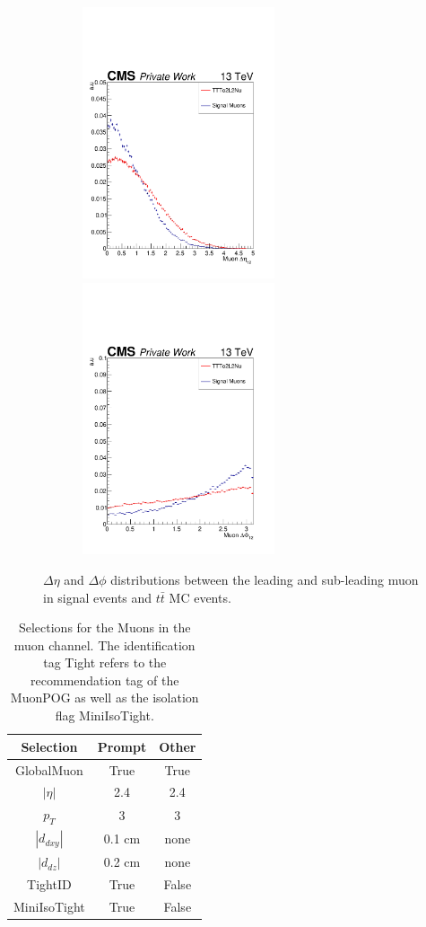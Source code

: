 \documentclass{cernatlasnote}
\begin{document}
\begin{figure}[ht]
\centering
\includegraphics[height=8cm, width=8cm, trim= 0cm 0cm 0cm 0.cm,clip]{images/Muon/MuonMuondEta.pdf}\includegraphics[height=8cm, width=8cm, trim= 0cm 0cm 0cm 0.cm,clip]{images/Muon/MuonMuondPhi.pdf}
\caption{\label{fig:MuondR} $\Delta\eta$ and $\Delta\phi$ distributions between the leading and sub-leading muon in signal events and $t\bar{t}$ MC events.}
\end{figure}
\FloatBarrier

\begin{table}[h]
\centering
\begin{tabular}{|c|c|c|}
  \hline
  \rowcolor{lightgray} 
  Selection & Prompt & Other \\
  \hline
  GlobalMuon & True & True\\
  $|\eta|$ & 2.4 & 2.4\\
  $p_T$ & 3 & 3\\
  $|d_{dxy}|$ & 0.1 cm & none\\
  $|d_{dz}|$ & 0.2 cm & none\\
  TightID & True & False\\
  MiniIsoTight & True & False\\
  \hline
\end{tabular}
    \caption{Selections for the Muons in the muon channel. The identification tag Tight refers to the recommendation tag of the MuonPOG \cite{MuonIDRun2} as well as the isolation flag MiniIsoTight. 
    \label{tab:MUONSEL}}
\end{table}
\end{document}
